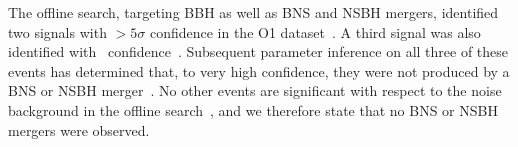 
The offline search, targeting \ac{BBH} as well as \ac{BNS} and \ac{NSBH} mergers, identified
two signals with $> 5 \sigma$ confidence in the \ac{O1} dataset~\citep{Abbott:2016blz,Abbott:2016nmj}. A third signal was
also identified with \LVBLAHsignificance\ confidence~\citep{TheLIGOScientific:2016pea, TheLIGOScientific:2016qqj}. Subsequent
parameter inference on all three of these events has determined that, to very high
confidence, they were not produced by a \ac{BNS} or \ac{NSBH} merger~\citep{TheLIGOScientific:2016wfe, TheLIGOScientific:2016pea}. No other events
are significant with respect to the noise background in the offline search~\citep{TheLIGOScientific:2016pea}, and
we therefore state that no \ac{BNS} or \ac{NSBH} mergers were observed.


